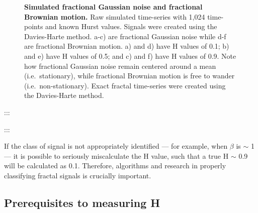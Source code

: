 \documentclass[
  sn-vancouver,
  Numbered,
  referee,
  lineno]{sn-jnl}
\begin{document}
\begin{figure}[H]


\caption{\label{fig-typicalsamplepaths}\textbf{Simulated fractional
Gaussian noise and fractional Brownian motion.} Raw simulated
time-series with 1,024 time-points and known Hurst values. Signals were
created using the Davies-Harte method. a-c) are fractional Gaussian
noise while d-f are fractional Brownian motion. a) and d) have H values
of 0.1; b) and e) have H values of 0.5; and c) and f) have H values of
0.9. Note how fractional Gaussian noise remain centered around a mean
(i.e.~stationary), while fractional Brownian motion is free to wander
(i.e.~non-stationary). Exact fractal time-series were created using the
Davies-Harte method.}

\end{figure}%

:::

:::

If the class of signal is not appropriately identified --- for example,
when \(\beta\) is \(\sim\) 1 --- it is possible to seriously
miscalculate the H value, such that a true H \(\sim\) 0.9 will be
calculated as 0.1. Therefore, algorithms and research in properly
classifying fractal signals is crucially important.

\subsection{Prerequisites to measuring
H}\label{prerequisites-to-measuring-h-2}
\end{document}
